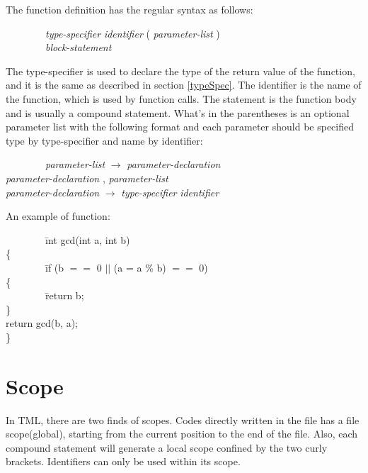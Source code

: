 \documentclass[12pt,psfig,a4]{article}
\begin{document}
The function definition has the regular syntax as follows:
\begin{code}
\begin{tabbing}
~~~~~~~~\= \textsl{type-specifier} \textsl{identifier} ( \textsl{parameter-list} ) \\
\> ~~~~~~~~\textsl{block-statement}
\end{tabbing}
\end{code}

The type-specifier is used to declare the type of the return value of the function, and it is the same as described in section \ref{typeSpec}. The identifier is the name of the function, which is used by function calls. The statement is the function body and is usually a compound statement. What's in the parentheses is an optional parameter list with the following format and each parameter should be specified type by type-specifier and name by identifier:
\begin{code}
\begin{tabbing}
~~~~~~~~\= \textsl{parameter-list} $\rightarrow$ \= \textsl{parameter-declaration} \\
\> \> \textsl{parameter-declaration} , \textsl{parameter-list} \\
\> \textsl{parameter-declaration} $\rightarrow$ \textsl{type-specifier} \textsl{identifier}
\end{tabbing}
\end{code}

An example of function:
\begin{code}
\begin{tabbing}
~~~~~~~~\= int gcd(int a, int b) \\
\> \{ \\
\> ~~~~~~~~\= if (b $==$ 0 $||$ (a = a \% b) $==$ 0) \\
\> \> \{ \\
\> \> ~~~~~~~~\= return b; \\
\> \> \} \\
\> \> return gcd(b, a); \\
\> \}
\end{tabbing}
\end{code}

\section{Scope}
In TML, there are two finds of scopes. Codes directly written in the file has a file scope(global), starting from the current position to the end of the file. Also, each compound statement will generate a local scope confined by the two curly brackets. Identifiers can only be used within its scope.
\end{document}
